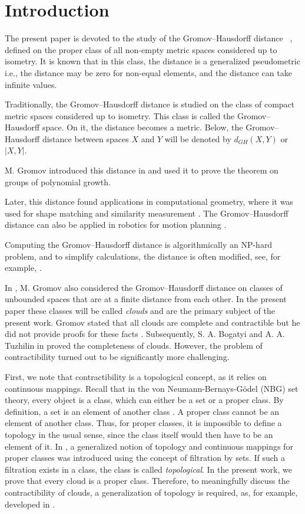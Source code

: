 
\section{Introduction}

The present paper is devoted to the study of the Gromov--Hausdorff
distance ~\cite{Edwards, Gromov81, Gromov99},
defined on the proper class of all non-empty metric spaces considered
up to isometry. It is known that in this class, the distance is a
generalized pseudometric i.e., the distance may be zero for non-equal
elements, and the distance can take infinite values.

Traditionally, the Gromov--Hausdorff distance is studied on the class
of compact metric spaces considered up to isometry. This class is
called the Gromov--Hausdorff space. On it, the distance becomes a
metric. Below, the Gromov--Hausdorff distance between spaces $ X $
and $ Y $ will be denoted by $ d_{GH}(X, Y) $ or $ |X, Y| $.

M. Gromov introduced this distance in \cite{Gromov81} and used it to
prove the theorem on groups of polynomial growth.

Later, this distance found applications in computational geometry,
where it was used for shape matching and similarity measurement
\cite{memoli1}. The Gromov--Hausdorff distance can also be applied in
robotics for motion planning \cite{robotics}.

Computing the Gromov--Hausdorff distance is algorithmically an
NP-hard problem, and to simplify calculations, the distance is often
modified, see, for example, \cite{memoli2}.

In \cite{Gromov99}, M. Gromov also considered the Gromov--Hausdorff
distance on classes of unbounded spaces that are at a finite distance
from each other. In the present paper these classes will be called
\emph{clouds} and are the primary subject of the present work. Gromov
stated that all clouds are complete and contractible but he did not
provide proofs for these facts \cite{Gromov99}. Subsequently, S. A.
Bogatyi and A. A. Tuzhilin in \cite{TuzhBog1} proved the completeness
of clouds. However, the problem of contractibility turned out to be
significantly more challenging.

First, we note that contractibility is a topological concept, as it
relies on continuous mappings. Recall that in the von
Neumann-Bernays-G\"odel (NBG) set theory, every object is a class,
which can either be a set or a proper class. By definition, a set is
an element of another class \cite{Neumann, Bernays, Godel}. A proper
class cannot be an element of another class. Thus, for proper
classes, it is impossible to define a topology in the usual sense,
since the class itself would then have to be an element of it. In
\cite{BorIvTuzh1}, a generalized notion of topology and continuous
mappings for proper classes was introduced using the concept of
filtration by sets. If such a filtration exists in a class, the class
is called \emph{topological}. In the present work, we prove that
every cloud is a proper class. Therefore, to meaningfully discuss the
contractibility of clouds, a generalization of topology is required,
as, for example, developed in \cite{BorIvTuzh1}.

